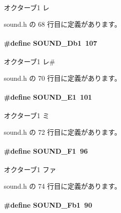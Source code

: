 オクターブ1 レ 



 sound.\+h の 68 行目に定義があります。

\paragraph[{S\+O\+U\+N\+D\+\_\+\+Db1}]{\setlength{\rightskip}{0pt plus 5cm}\#define S\+O\+U\+N\+D\+\_\+\+Db1~107}\label{sound_8h_a38bf3c917fff3545f77a76715ad4b0f4_a38bf3c917fff3545f77a76715ad4b0f4}


オクターブ1 レ\# 



 sound.\+h の 70 行目に定義があります。

\paragraph[{S\+O\+U\+N\+D\+\_\+\+E1}]{\setlength{\rightskip}{0pt plus 5cm}\#define S\+O\+U\+N\+D\+\_\+\+E1~101}\label{sound_8h_a1009235392ed7690560707d81815b36b_a1009235392ed7690560707d81815b36b}


オクターブ1 ミ 



 sound.\+h の 72 行目に定義があります。

\paragraph[{S\+O\+U\+N\+D\+\_\+\+F1}]{\setlength{\rightskip}{0pt plus 5cm}\#define S\+O\+U\+N\+D\+\_\+\+F1~96}\label{sound_8h_a48a50ebd455ec326ce52ba3f9e063baa_a48a50ebd455ec326ce52ba3f9e063baa}


オクターブ1 ファ 



 sound.\+h の 74 行目に定義があります。

\paragraph[{S\+O\+U\+N\+D\+\_\+\+Fb1}]{\setlength{\rightskip}{0pt plus 5cm}\#define S\+O\+U\+N\+D\+\_\+\+Fb1~90}\label{sound_8h_adc081179e66a0f7fe8f58b07f0358ed8_adc081179e66a0f7fe8f58b07f0358ed8}


